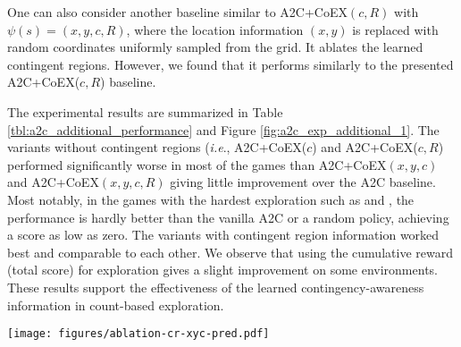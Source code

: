 \documentclass{article} \usepackage{iclr,times}
\makeatletter
\newcommand{\coex}{{CoEX}}
\DeclareRobustCommand\onedot{\futurelet\@let@token\@onedot}
\def\onedot{.}
\def\ie{\emph{i.e}\onedot} \def\Ie{\emph{I.e}\onedot}
\makeatother
\begin{document}
{One can also consider another baseline similar to A2C+\coex$(c,R)$
with $\psi(s) = (x, y, c, R)$,
where the location information $(x, y)$ is replaced with random coordinates uniformly sampled from the grid.
It ablates the learned contingent regions.
However, we found that it performs similarly to the presented A2C+CoEX($c, R$) baseline.

The experimental results are summarized in Table \ref{tbl:a2c_additional_performance} and
Figure \ref{fig:a2c_exp_additional_1}. The variants without contingent regions
(\ie, A2C+\coex($c$) and A2C+\coex($c,R$)
performed significantly worse in most of the games than
A2C+\coex$(x,y,c)$ and
A2C+\coex$(x,y,c,R)$ 
giving little improvement over the A2C baseline.
Most notably, in the games with the hardest exploration such as \MontezumaRevenge and \Venture,
the performance is hardly better than the vanilla A2C or a random policy, achieving a score as low as zero.
The variants with contingent region information worked best and comparable to each other.
We observe that using the cumulative reward (total score) for exploration
gives a slight improvement on some environments.
These results support the effectiveness of the learned contingency-awareness information in count-based exploration.







\begin{figure*}[t]
\begin{center}
\texttt{[image: figures/ablation-cr-xyc-pred.pdf]}
\vspace*{-0.5cm}
    \caption{
        Learning curves for the ablation study of state representation.
The exploration algorithm without the contingent region information (purple)
        performs significantly worse, yielding almost no improvement on hard-exploration games such as
        \MontezumaRevenge, \Venture, and \Frostbite.
        {The mean curve is obtained by averaging over 3 random seeds.}
        See Table \ref{tbl:a2c_additional_performance} for numbers.
    }
    \label{fig:a2c_exp_additional_1}
    \vspace*{-5pt}
\end{center}
\end{figure*}






}
\end{document}
